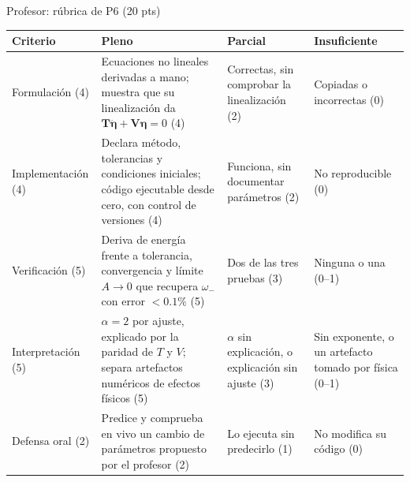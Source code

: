 \documentclass[spanish]{beamer}
\newcommand{\Tm}{\mathbf{T}}              %
\newcommand{\Vm}{\mathbf{V}}              %
\newcommand{\bfeta}{\boldsymbol{\eta}}    %
\begin{document}
\begin{frame}{Profesor: rúbrica de P6 (20 pts)}
\scriptsize\setlength{\tabcolsep}{3pt}
\begin{tabular}{@{}L{0.19\textwidth}L{0.31\textwidth}L{0.22\textwidth}L{0.2\textwidth}@{}}
\toprule
\textbf{Criterio} & \textbf{Pleno} & \textbf{Parcial} & \textbf{Insuficiente}\\
\midrule
Formulación (4) & Ecuaciones no lineales derivadas a mano; muestra que su linealización da $\Tm\ddot{\bfeta}+\Vm\bfeta=0$ (4) & Correctas, sin comprobar la linealización (2) & Copiadas o incorrectas (0) \\
Implemen\-tación (4) & Declara método, tolerancias y condiciones iniciales; código ejecutable desde cero, con control de versiones (4) & Funciona, sin documentar parámetros (2) & No reproducible (0) \\
Verificación (5) & Deriva de energía frente a tolerancia, convergencia y límite $A\to0$ que recupera $\omega_-$ con error $<0.1\%$ (5) & Dos de las tres pruebas (3) & Ninguna o una (0--1) \\
Interpretación (5) & $\alpha=2$ por ajuste, explicado por la paridad de $T$ y $V$; separa artefactos numéricos de efectos físicos (5) & $\alpha$ sin explicación, o explicación sin ajuste (3) & Sin exponente, o un artefacto tomado por física (0--1) \\
Defensa oral (2) & Predice y comprueba en vivo un cambio de parámetros propuesto por el profesor (2) & Lo ejecuta sin predecirlo (1) & No modifica su código (0) \\
\bottomrule
\end{tabular}
\end{frame}
\fi
\end{document}
